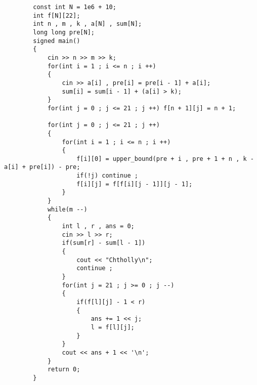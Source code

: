 \documentclass[E:/GsjzTle/main/main.tex]{subfiles}
\begin{document}
	\begin{lstlisting}
		const int N = 1e6 + 10;
		int f[N][22];
		int n , m , k , a[N] , sum[N];
		long long pre[N]; 
		signed main()
		{
			cin >> n >> m >> k;
			for(int i = 1 ; i <= n ; i ++)
			{
				cin >> a[i] , pre[i] = pre[i - 1] + a[i];
				sum[i] = sum[i - 1] + (a[i] > k); 
			}
			for(int j = 0 ; j <= 21 ; j ++) f[n + 1][j] = n + 1;
			
			for(int j = 0 ; j <= 21 ; j ++)
			{
				for(int i = 1 ; i <= n ; i ++)
				{
					f[i][0] = upper_bound(pre + i , pre + 1 + n , k - a[i] + pre[i]) - pre;
					if(!j) continue ;
					f[i][j] = f[f[i][j - 1]][j - 1]; 
				}
			}
			while(m --)
			{
				int l , r , ans = 0;
				cin >> l >> r;
				if(sum[r] - sum[l - 1]) 
				{
					cout << "Chtholly\n";	
					continue ;
				}
				for(int j = 21 ; j >= 0 ; j --)
				{
					if(f[l][j] - 1 < r) 
					{
						ans += 1 << j;
						l = f[l][j];
					}
				}
				cout << ans + 1 << '\n';
			}
			return 0;
		}
	\end{lstlisting}
	
	
\end{document}
